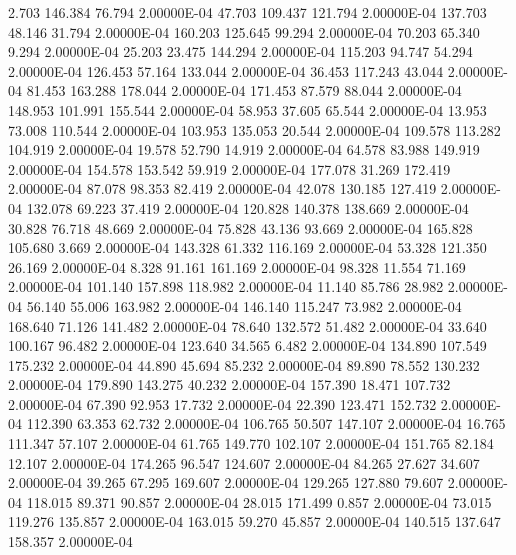      2.703   146.384    76.794  2.00000E-04
    47.703   109.437   121.794  2.00000E-04
   137.703    48.146    31.794  2.00000E-04
   160.203   125.645    99.294  2.00000E-04
    70.203    65.340     9.294  2.00000E-04
    25.203    23.475   144.294  2.00000E-04
   115.203    94.747    54.294  2.00000E-04
   126.453    57.164   133.044  2.00000E-04
    36.453   117.243    43.044  2.00000E-04
    81.453   163.288   178.044  2.00000E-04
   171.453    87.579    88.044  2.00000E-04
   148.953   101.991   155.544  2.00000E-04
    58.953    37.605    65.544  2.00000E-04
    13.953    73.008   110.544  2.00000E-04
   103.953   135.053    20.544  2.00000E-04
   109.578   113.282   104.919  2.00000E-04
    19.578    52.790    14.919  2.00000E-04
    64.578    83.988   149.919  2.00000E-04
   154.578   153.542    59.919  2.00000E-04
   177.078    31.269   172.419  2.00000E-04
    87.078    98.353    82.419  2.00000E-04
    42.078   130.185   127.419  2.00000E-04
   132.078    69.223    37.419  2.00000E-04
   120.828   140.378   138.669  2.00000E-04
    30.828    76.718    48.669  2.00000E-04
    75.828    43.136    93.669  2.00000E-04
   165.828   105.680     3.669  2.00000E-04
   143.328    61.332   116.169  2.00000E-04
    53.328   121.350    26.169  2.00000E-04
     8.328    91.161   161.169  2.00000E-04
    98.328    11.554    71.169  2.00000E-04
   101.140   157.898   118.982  2.00000E-04
    11.140    85.786    28.982  2.00000E-04
    56.140    55.006   163.982  2.00000E-04
   146.140   115.247    73.982  2.00000E-04
   168.640    71.126   141.482  2.00000E-04
    78.640   132.572    51.482  2.00000E-04
    33.640   100.167    96.482  2.00000E-04
   123.640    34.565     6.482  2.00000E-04
   134.890   107.549   175.232  2.00000E-04
    44.890    45.694    85.232  2.00000E-04
    89.890    78.552   130.232  2.00000E-04
   179.890   143.275    40.232  2.00000E-04
   157.390    18.471   107.732  2.00000E-04
    67.390    92.953    17.732  2.00000E-04
    22.390   123.471   152.732  2.00000E-04
   112.390    63.353    62.732  2.00000E-04
   106.765    50.507   147.107  2.00000E-04
    16.765   111.347    57.107  2.00000E-04
    61.765   149.770   102.107  2.00000E-04
   151.765    82.184    12.107  2.00000E-04
   174.265    96.547   124.607  2.00000E-04
    84.265    27.627    34.607  2.00000E-04
    39.265    67.295   169.607  2.00000E-04
   129.265   127.880    79.607  2.00000E-04
   118.015    89.371    90.857  2.00000E-04
    28.015   171.499     0.857  2.00000E-04
    73.015   119.276   135.857  2.00000E-04
   163.015    59.270    45.857  2.00000E-04
   140.515   137.647   158.357  2.00000E-04
